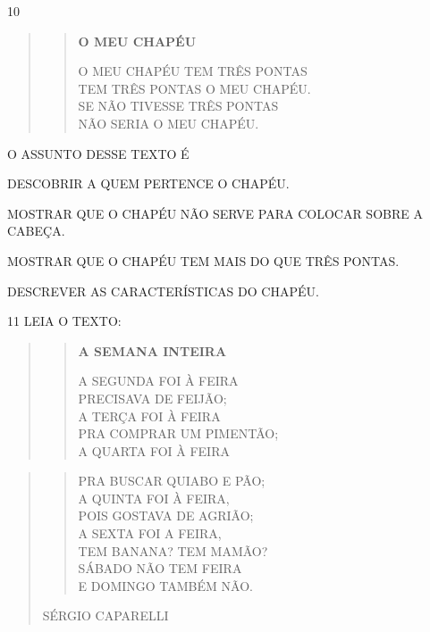 \num{10}

\begin{quote}
\begin{verse}
\textbf{O MEU CHAPÉU}

O MEU CHAPÉU TEM TRÊS PONTAS\\
TEM TRÊS PONTAS O MEU CHAPÉU.\\
SE NÃO TIVESSE TRÊS PONTAS\\
NÃO SERIA O MEU CHAPÉU.
\end{verse}

\end{quote}

O ASSUNTO DESSE TEXTO É

\begin{escolha}
\item DESCOBRIR A QUEM PERTENCE O CHAPÉU.

\item MOSTRAR QUE O CHAPÉU NÃO SERVE PARA COLOCAR SOBRE A CABEÇA.

\item MOSTRAR QUE O CHAPÉU TEM MAIS DO QUE TRÊS PONTAS.

\item DESCREVER AS CARACTERÍSTICAS DO CHAPÉU.
\end{escolha}


\num{11} LEIA O TEXTO:

\begin{quote}
\begin{verse}
\textbf{A SEMANA INTEIRA}

A SEGUNDA FOI À FEIRA\\
PRECISAVA DE FEIJÃO;\\
A TERÇA FOI À FEIRA\\
PRA COMPRAR UM PIMENTÃO;\\
A QUARTA FOI À FEIRA
\end{verse}
\end{quote}


\begin{quote}
\begin{verse}
PRA BUSCAR QUIABO E PÃO;\\
A QUINTA FOI À FEIRA,\\
POIS GOSTAVA DE AGRIÃO;\\
A SEXTA FOI A FEIRA,\\
TEM BANANA? TEM MAMÃO?\\
SÁBADO NÃO TEM FEIRA\\
E DOMINGO TAMBÉM NÃO.
\end{verse}

\begin{flushright}
SÉRGIO CAPARELLI
\end{flushright}
\end{quote}

